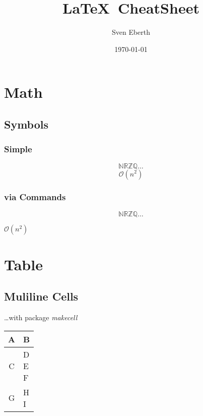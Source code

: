 \documentclass[11pt]{article}
\title{\LaTeX~CheatSheet}
\author{Sven Eberth}
\date{\today}
\begin{document}
    \maketitle
    \tableofcontents
    \newpage


    \section{Math}\label{sec:math}
		\subsection{Symbols}
			\subsubsection{Simple}
		    \[ \mathbb{N R Z Q} \ldots \]
		    \[ \mathcal{O}(n^2) \]
		
		    \subsubsection{via Commands}
		    \newcommand{\N}[0]{\mathbb{N}}
		    \newcommand{\R}[0]{\mathbb{R}}
		    \newcommand{\Z}[0]{\mathbb{Z}}
		    \newcommand{\Q}[0]{\mathbb{Q}}
		    
		    \newcommand{\bigO}[1]{$\mathcal{O}(#1)$}
		
		    \[ \N \R \Z \Q \ldots \]
		    \begin{center}
			    	\bigO{n^2}
			\end{center}


    \section{Table}\label{sec:table}
		\subsection{Muliline Cells}
		\ldots with package \textit{makecell}
		
		\begin{tabular}{cl}
			A		& B  \\
			\hline
			C		& \makecell[tl]{D \\ E \\ F} \\
			\hline
			G		& \makecell[tr]{H \\ I}
	    \end{tabular}
    
\end{document}
